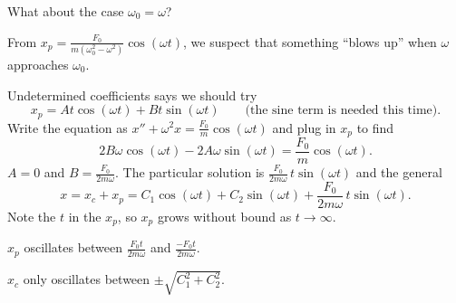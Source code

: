 \documentclass[10pt,aspectratio=169]{beamer}
\begin{document}
\begin{frame}
What about the case $\omega_0 = \omega$?

\medskip
\pause

From $x_p = \frac{F_0}{m(\omega_0^2 - \omega^2)} \cos (\omega t)$, we suspect
that something ``blows up'' when $\omega$ approaches $\omega_0$.

\medskip
\pause

Undetermined coefficients says we should try
\[
x_p = A t \cos (\omega t) + B t \sin (\omega t)
\qquad \text{(the sine term is needed this time)}.
\]
\pause
Write the equation as
\qquad $x'' + \omega^2 x = \frac{F_0}{m} \cos ( \omega t)$
\qquad and plug in $x_p$ to find
\[
2 B \omega \cos (\omega t) - 2 A \omega \sin (\omega t) = 
\frac{F_0}{m} \cos (\omega t) .
\]
\pause
$A = 0$ and $B = \frac{F_0}{2m\omega}$. \pause  The particular solution is
$\frac{F_0}{2m\omega} \, t \sin (\omega t)$ and the general
\[
x = x_c + x_p = C_1 \cos (\omega t) + C_2 \sin (\omega t)
+ \frac{F_0}{2m\omega} \, t \sin (\omega t) .
\]
Note the $t$ in the $x_p$, so $x_p$ grows without bound as $t \to \infty$.

$x_p$ oscillates between $\frac{F_0 t}{2m\omega}$ and
$\frac{- F_0 t}{2m\omega}$.

$x_c$ only oscillates between
$\pm\sqrt{C_1^2 + C_2^2}$.

\end{frame}
\end{document}
